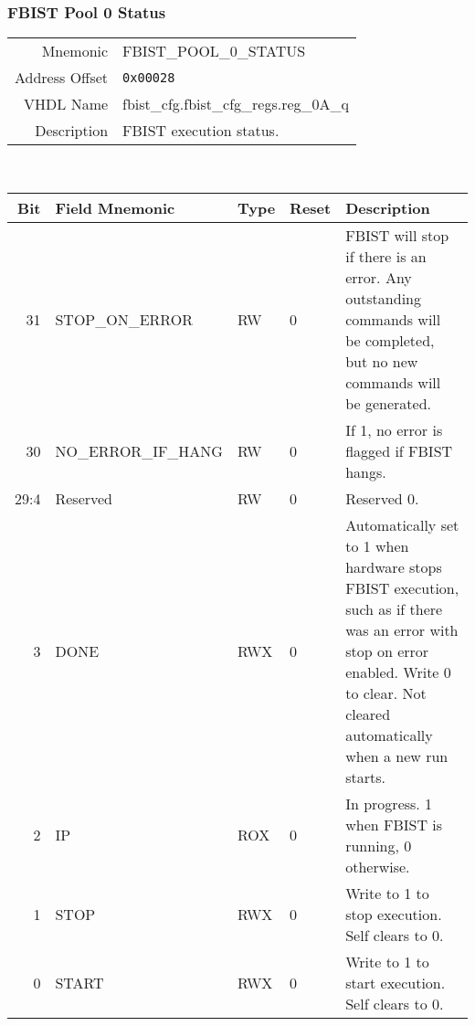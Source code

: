\subsubsection{FBIST Pool 0 Status}
\begin{tabular}{ r | p{350px} }
  Mnemonic       & FBIST\_POOL\_0\_STATUS                  \\
  Address Offset & \texttt{0x00028}                        \\
  VHDL Name      &  fbist\_cfg.fbist\_cfg\_regs.reg\_0A\_q \\ \hline

  Description &
  FBIST execution status. \\
\end{tabular}
\\
\begin{tabularx}{\textwidth}{r|l|l|l|X}
  \hline
  Bit   & Field Mnemonic      & Type & Reset & Description \\ \hline

  31    & STOP\_ON\_ERROR     & RW   & 0     &

  FBIST will stop if there is an error. Any outstanding commands will
  be completed, but no new commands will be generated. \\

  30    & NO\_ERROR\_IF\_HANG & RW   & 0     &

  If 1, no error is flagged if FBIST hangs. \\

  29:4  & Reserved            & RW   & 0     &

  Reserved 0. \\

  3     & DONE                & RWX  & 0     &

  Automatically set to 1 when hardware stops FBIST execution, such as
  if there was an error with stop on error enabled. Write 0 to
  clear. Not cleared automatically when a new run starts. \\

  2     & IP                  & ROX  & 0     &

  In progress. 1 when FBIST is running, 0 otherwise. \\

  1     & STOP                & RWX  & 0     &

  Write to 1 to stop execution. Self clears to 0. \\

  0     & START               & RWX  & 0     &

  Write to 1 to start execution. Self clears to 0. \\
\end{tabularx}

